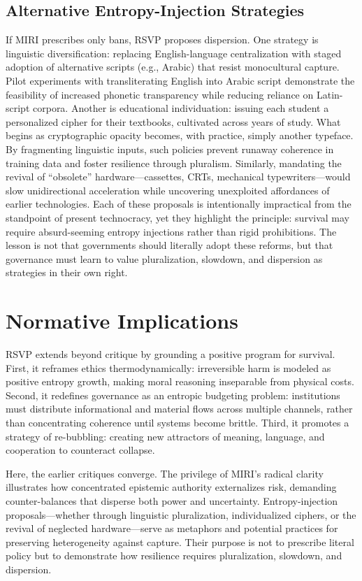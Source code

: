 \documentclass[12pt]{article}
\begin{document}
\subsection{Alternative Entropy-Injection Strategies}
If MIRI prescribes only bans, RSVP proposes dispersion. 
One strategy is linguistic diversification: replacing English-language centralization with staged adoption of alternative scripts (e.g., Arabic) that resist monocultural capture. 
Pilot experiments with transliterating English into Arabic script demonstrate the feasibility of increased phonetic transparency while reducing reliance on Latin-script corpora. 
Another is educational individuation: issuing each student a personalized cipher for their textbooks, cultivated across years of study. 
What begins as cryptographic opacity becomes, with practice, simply another typeface. 
By fragmenting linguistic inputs, such policies prevent runaway coherence in training data and foster resilience through pluralism. 
Similarly, mandating the revival of “obsolete” hardware—cassettes, CRTs, mechanical typewriters—would slow unidirectional acceleration while uncovering unexploited affordances of earlier technologies. 
Each of these proposals is intentionally impractical from the standpoint of present technocracy, yet they highlight the principle: survival may require absurd-seeming entropy injections rather than rigid prohibitions. 
The lesson is not that governments should literally adopt these reforms, but that governance must learn to value pluralization, slowdown, and dispersion as strategies in their own right.


\section{Normative Implications}
RSVP extends beyond critique by grounding a positive program for survival. 
First, it reframes ethics thermodynamically: irreversible harm is modeled as positive entropy growth, making moral reasoning inseparable from physical costs. 
Second, it redefines governance as an entropic budgeting problem: institutions must distribute informational and material flows across multiple channels, rather than concentrating coherence until systems become brittle. 
Third, it promotes a strategy of re-bubbling: creating new attractors of meaning, language, and cooperation to counteract collapse.

Here, the earlier critiques converge. 
The privilege of MIRI’s radical clarity illustrates how concentrated epistemic authority externalizes risk, demanding counter-balances that disperse both power and uncertainty. 
Entropy-injection proposals—whether through linguistic pluralization, individualized ciphers, or the revival of neglected hardware—serve as metaphors and potential practices for preserving heterogeneity against capture. 
Their purpose is not to prescribe literal policy but to demonstrate how resilience requires pluralization, slowdown, and dispersion. 
\end{document}
